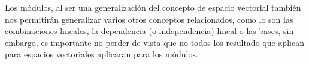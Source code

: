 Los módulos, al ser una generalización del concepto de espacio vectorial también nos permitirán generalizar varios otros conceptos relacionados, como lo son las combinaciones lineales, la dependencia (o independencia) lineal o las bases, sin embargo, es importante no perder de vista que no todos los resultado que aplican para espacios vectoriales aplicaran para los módulos.





